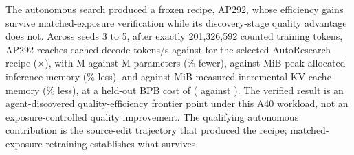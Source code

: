 The autonomous search produced a frozen recipe, AP292, whose efficiency gains survive matched-exposure verification while its discovery-stage quality advantage does not.
Across seeds 3 to 5, after exactly 201,326,592 counted training tokens, AP292 reaches \APSpeed{} cached-decode tokens/s against \ARSpeed{} for the selected AutoResearch recipe (\DecodeRatio$\times$), with \APParams{}M against \ARParams{}M parameters (\ParameterReduction\% fewer), \APMemory{} against \ARMemory{} MiB peak allocated inference memory (\MemoryReduction\% less), and \APKV{} against \ARKV{} MiB measured incremental KV-cache memory (\KVReduction\% less), at a held-out BPB cost of \BPBCost{} (\APBPB{} against \ARBPB{}).
The verified result is an agent-discovered quality-efficiency frontier point under this A40 workload, not an exposure-controlled quality improvement. The qualifying autonomous contribution is the source-edit trajectory that produced the recipe; matched-exposure retraining establishes what survives.
